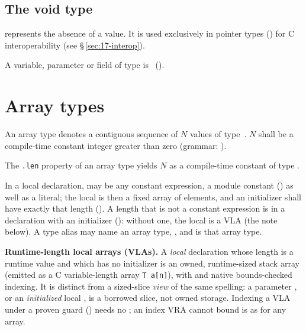 \subsection{The void type}
\label{sec:types.void}

\pnum
{} represents the absence of a value.  It is used exclusively
in pointer types () for C interoperability (see
\S\,\ref{sec:17-interop}).

\begin{constraint}
  A variable, parameter or field of type  is
  \illformed{}~().
\end{constraint}

\section{Array types}
\label{sec:types.array}

\pnum
An array type  denotes a contiguous sequence of $N$ values of
type~.  $N$ shall be a compile-time constant integer greater than
zero (grammar: ).

\pnum
The \texttt{.len} property of an array type yields $N$ as a compile-time
constant of type .

\pnum
In a local declaration,  may be any constant expression, a module constant
() as well as a literal; the local is then a fixed array of 
elements, and an initializer shall have exactly that length (). A length that is
not a constant expression is \illformed{} in a declaration with an initializer
(): without one, the local is a VLA (the note below). A type alias may name an
array type, , and is that array type.

\begin{note}
  \textbf{Runtime-length local arrays (VLAs).}  A \emph{local} declaration
   whose length  is a runtime value and which has no
  initializer is an owned, runtime-sized stack array (emitted as a C
  variable-length array \texttt{T a[n]}), with  and native
  bounds-checked indexing.  It is distinct from a sized-slice \emph{view} of the
  same spelling: a parameter , or an \emph{initialized} local
  , is a borrowed  slice, not owned
  storage.  Indexing a VLA under a proven guard () needs no
  ; an index VRA cannot bound is  as for any array.
\end{note}

